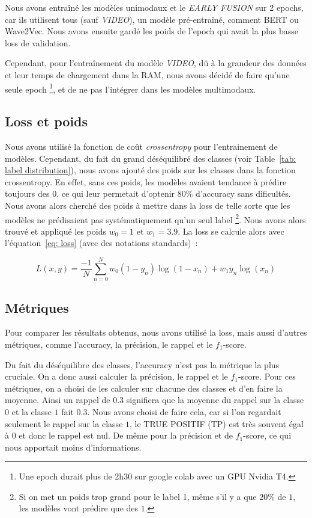 Nous avons entraîné les modèles unimodaux et le \textit{EARLY FUSION} sur 2 epochs, car ils utilisent tous (sauf \textit{VIDEO}), 
un modèle pré-entraîné, comment BERT ou Wave2Vec. Nous avons ensuite gardé les poids de 
l'epoch qui avait la plus basse loss de validation.

Cependant, pour l'entraînement du modèle \textit{VIDEO}, dû à la grandeur des données et 
leur temps de chargement dans la RAM, nous avons décidé de faire qu'une seule epoch
\footnote{Une epoch durait plus de 2h30 sur google colab avec un GPU Nvidia T4.}, et de ne pas l'intégrer dans les modèles multimodaux.

\subsection{Loss et poids}
Nous avons utilisé la fonction de coût \textit{crossentropy} pour l'entrainement de modèles. 
Cependant, du fait du grand déséquilibré des classes (voir Table~\ref{tab: label distribution}), nous avons ajouté des poids 
sur les classes dans la fonction crossentropy. En effet, sans ces poids, les modèles avaient tendance à prédire toujours des $0$, ce 
qui leur permetait d'optenir $80\%$ d'accuracy sans dificultés. Nous avons alors cherché des poids à mettre dans la loss de telle sorte 
que les modèles ne prédisaient pas systématiquement qu'un seul label
\footnote{Si on met un poids trop grand pour le label 1, même s'il y a que $20\%$ de $1$, les modèles vont prédire que des $1$.}.
Nous avons alors trouvé et appliqué les poids $w_0 = 1$ et $w_1=3.9$. La loss se calcule alors avec l'équation~\ref{eq: loss}
(avec des notations standards)~:

\begin{equation}
    L(x, y) = \frac{-1}{N} \sum_{n=0}^{N} w_0 (1-y_n) \log(1-x_n) + w_1 y_n \log(x_n)
    \label{eq: loss}
\end{equation}

\subsection{Métriques}
Pour comparer les résultats obtenus, nous avons utilisé la loss, mais aussi d'autres métriques,
comme l'accuracy, la précision, le rappel et le $f_1$-score.

Du fait du déséquilibre des classes, l'accuracy n'est pas la métrique la plus cruciale. On a donc aussi calculer la précision, le rappel et le $f_1$-score. Pour ces métriques, on a choisi de les calculer 
sur chacune des classes et d'en faire la moyenne. Ainsi un rappel de $0.3$ signifiera que la moyenne du rappel sur
la classe $0$ et la classe $1$ fait $0.3$. Nous avons choisi de faire cela, car si l'on regardait seulement 
le rappel sur la classe $1$, le TRUE POSITIF (TP) est très souvent égal à $0$ et donc le rappel est nul. De même 
pour la précision et de $f_1$-score, ce qui nous apportait moins d'informations.